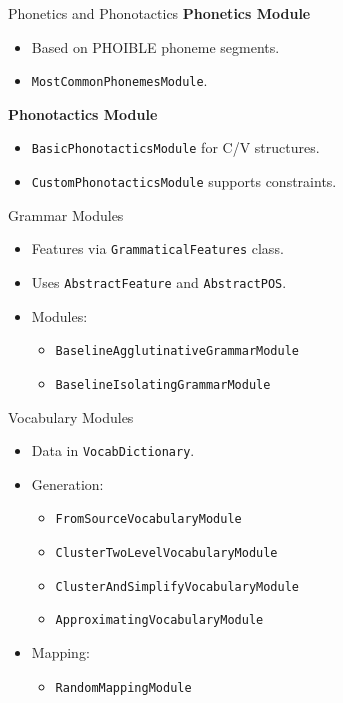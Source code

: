 \documentclass{beamer}
\begin{document}
\begin{frame}{Phonetics and Phonotactics}
	\textbf{Phonetics Module}
	\begin{itemize}
		\item Based on PHOIBLE phoneme segments.
		\item \texttt{MostCommonPhonemesModule}.
	\end{itemize}
	\textbf{Phonotactics Module}
	\begin{itemize}
		\item \texttt{BasicPhonotacticsModule} for C/V structures.
		\item \texttt{CustomPhonotacticsModule} supports constraints.
	\end{itemize}
\end{frame}

\begin{frame}{Grammar Modules}
	\begin{itemize}
		\item Features via \texttt{GrammaticalFeatures} class.
		\item Uses \texttt{AbstractFeature} and \texttt{AbstractPOS}.
		\item Modules:
		\begin{itemize}
			\item \texttt{BaselineAgglutinativeGrammarModule}
			\item \texttt{BaselineIsolatingGrammarModule}
		\end{itemize}
	\end{itemize}
\end{frame}

\begin{frame}{Vocabulary Modules}
	\begin{itemize}
		\item Data in \texttt{VocabDictionary}.
		\item Generation:
		\begin{itemize}
			\item \texttt{FromSourceVocabularyModule}
			\item \texttt{ClusterTwoLevelVocabularyModule}
			\item \texttt{ClusterAndSimplifyVocabularyModule}
			\item \texttt{ApproximatingVocabularyModule}
		\end{itemize}
		\item Mapping:
		\begin{itemize}
			\item \texttt{RandomMappingModule}
		\end{itemize}
	\end{itemize}
\end{frame}
\end{document}
